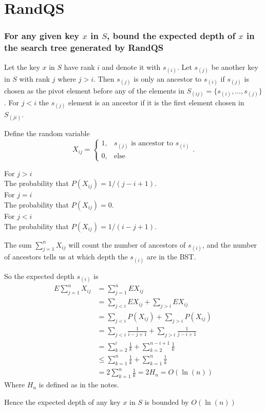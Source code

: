 \section*{RandQS}
\subsubsection*{For any given key $x$ in $S$, bound the expected depth of $x$ in the search tree generated by RandQS}

Let the key $x$ in $S$ have rank $i$ and denote it with $s_{(i)}$. Let $s_{(j)}$ be another key in $S$ with rank $j$ where $j>i$. 
Then $s_{(j)}$ is only an ancestor to $s_{(i)}$ if $s_{(j)}$ is chosen as the pivot element before any of the elements in $S_{(ij)} = \{s_{(i)},\ldots,s_{(j)}\}$. For $j<i$ the $s_{(j)}$ element is an ancestor if it is the first element chosen in $S_{(ji)}$.

Define the random variable 
$$
X_{ij}=
\begin{cases}
1, & s_{(j)} \text{ is ancestor to } s_{(i)}\\
0, &\text{else}
\end{cases}.
$$

For $j>i$ 
\\
The probability that $P(X_{ij}) = 1/(j-i+1)$.
\\
For $j=i$ 
\\
The probability that $P(X_{ij}) = 0$.
\\
For $j<i$ 
\\
The probability that $P(X_{ij}) = 1/(i-j+1)$.

The sum $\sum_{j=1}^n X_{ij}$ will count the number of ancestors of $s_{(i)}$, and the number of ancestors tells us at which depth the $s_{(i)}$ are in the BST.

So the expected depth $s_{(i)}$ is
\begin{align*}
E \sum_{j=1}^n X_{ij} &=  \sum_{j=1}^n EX_{ij} \\
                      &= \sum_{j<i} EX_{ij} + \sum_{j>i} EX_{ij} \\
											&= \sum_{j<i} P(X_{ij}) + \sum_{j>i} P(X_{ij})\\
											&= \sum_{j<i} \frac{1}{i-j+1} + \sum_{j>i} \frac{1}{j-i+1}\\
											&= \sum_{k=2}^i \frac{1}{k} + \sum_{k=2}^{n-i+1} \frac{1}{k}\\
											&\leq \sum_{k=1}^n \frac{1}{k} + \sum_{k=1}^{n} \frac{1}{k}\\
											&= 2\sum_{k=1}^n \frac{1}{k} = 2H_n = O(\ln(n))
\end{align*}
Where $H_n$ is defined as in the notes.

Hence the expected depth of any key $x$ in $S$ is bounded by $O(\ln(n))$